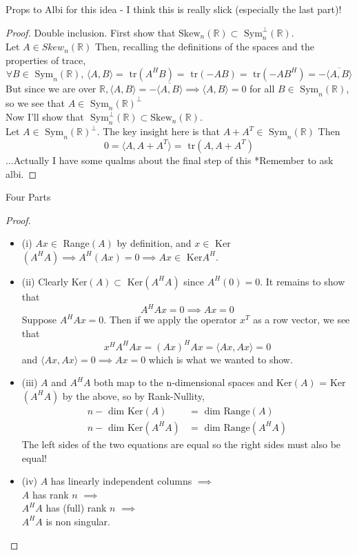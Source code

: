 \documentclass[12pt]{article}
\newenvironment{problem}[2][Problem]{\begin{trivlist}
\item[\hskip \labelsep {\bfseries #1}\hskip \labelsep {\bfseries #2.}]}{\end{trivlist}}
\theoremstyle{definition}
\theoremstyle{definition}
\theoremstyle{definition}
\theoremstyle{definition}
\begin{document}
\begin{problem}{3.45}
Props to Albi for this idea - I think this is really slick (especially the last part)!
\begin{proof}
Double inclusion. First show that $\text{Skew}_n(\mathbb{R}) \subset \text{ Sym}_n^\perp(\mathbb{R})$. \\
Let $A \in {Skew}_n(\mathbb{R})$ Then, recalling the definitions of the spaces and the properties of trace,
$$\forall B \in \text{ Sym}_n(\mathbb{R})\text{, } \langle A, B \rangle = \text{ tr}(A^HB) = \text{ tr}(-AB) = \text{ tr}(-AB^H) = -\overline{\langle A, B \rangle}
$$ 
But since we are over $\mathbb{R}, \langle A, B \rangle = -\overline{\langle A, B \rangle} \implies \langle A,B \rangle = 0$ for all $B \in \text{ Sym}_n(\mathbb{R})$, so we see that $A \in \text{ Sym}_n(\mathbb{R})^{\perp}$ \\
Now I'll show that $\text{ Sym}_n^\perp(\mathbb{R}) \subset \text{Skew}_n(\mathbb{R})$. \\
Let $A \in \text{ Sym}_n(\mathbb{R})^\perp$. The key insight here is that $A+A^T \in \text{ Sym}_n(\mathbb{R})$ Then 
$$
0 = \langle A, A+A^T \rangle = \text{ tr}(A, A+A^T)
$$
...Actually I have some qualms about the final step of this *Remember to ask albi.
\end{proof}
\end{problem}

\begin{problem}{3.46} Four Parts
\begin{proof}
\begin{itemize}
\item (i) $Ax \in$ Range$(A)$ by definition, and $x \in$ Ker$(A^HA) \implies A^H(Ax) = 0 \implies Ax \in$ Ker$A^H$.
\item (ii) Clearly Ker$(A) \subset $ Ker$(A^HA)$ since $A^H(0) = 0$. It remains to show that 
$$A^HAx = 0 \implies Ax = 0$$
Suppose $A^HAx = 0$. Then if we apply the operator $x^T$ as a row vector, we see that 
$$
x^HA^HAx = (Ax)^HAx = \langle Ax, Ax \rangle = 0
$$
and $\langle Ax, Ax \rangle = 0 \implies Ax = 0$ which is what we wanted to show.
\item (iii) $A$ and $A^HA$ both map to the n-dimensional spaces and Ker$(A)$ = Ker$(A^HA)$ by the above, so by Rank-Nullity,
\begin{align*}
n - \text{ dim Ker}(A) &= \text{ dim Range}(A) \\
n - \text{ dim Ker}(A^HA) &= \text{ dim Range}(A^HA)
\end{align*}
The left sides of the two equations are equal so the right sides must also be equal!
\item (iv) $A$ has linearly independent columns $\implies $ \\
$A$ has rank $n$ $\implies$ \\
$A^HA$ has (full) rank $n$ $\implies$ \\
$A^HA$ is non singular.
\end{itemize}
\end{proof}
\end{problem}
\end{document}

